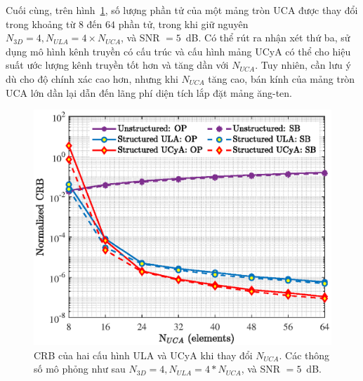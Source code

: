 Cuối cùng, trên hình~\ref{fig:op_NUCA}, số lượng phần tử của một mảng tròn UCA được thay đổi trong khoảng từ $8$ đến $64$ phần tử, trong khi giữ nguyên $N_{3D} = 4, N_{ULA} = 4 \times N_{UCA}$, và SNR $=5$~dB. Có thể rút ra nhận xét thứ ba, sử dụng mô hình kênh truyền có cấu trúc và cấu hình mảng UCyA có thể cho hiệu suất ước lượng kênh truyền tốt hơn và tăng dần với $N_{UCA}$. Tuy nhiên, cần lưu ý dù cho độ chính xác cao hơn, nhưng khi $N_{UCA}$ tăng cao, bán kính của mảng tròn UCA lớn dần lại dẫn đến lãng phí diện tích lắp đặt mảng ăng-ten.
\begin{figure}[ht]
    \centering
    \includegraphics[width=.7\linewidth]{figures/fig_3_3.eps}
    \caption{CRB của hai cấu hình ULA và UCyA khi thay đổi $N_{UCA}$. Các thông số mô phỏng như sau $N_{3D} = 4, N_{ULA} = 4 * N_{UCA}$, và SNR $=5$~dB.}
    \label{fig:op_NUCA}
\end{figure}